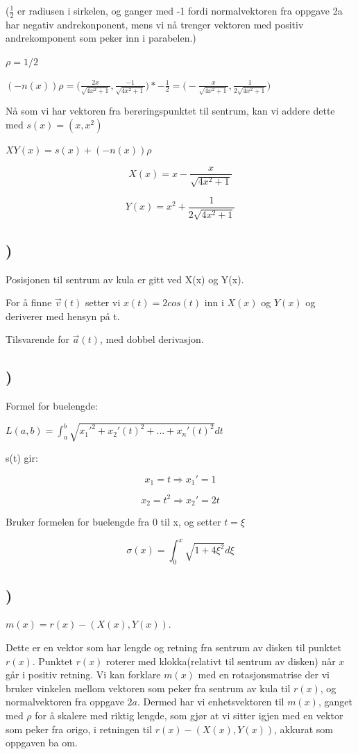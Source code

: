 \documentclass[a4paper,10pt,norsk]{article}
\begin{document}
($\frac{1}{2}$ er radiusen i sirkelen, og ganger med -1 fordi normalvektoren fra oppgave 2a har negativ andrekonponent, mens vi nå trenger vektoren med positiv andrekomponent som peker inn i parabelen.)

$\rho = 1/2$

$(-n(x))\rho= \Big( \frac{2x}{\sqrt{4x^{2} + 1}}, \frac{-1}{\sqrt{4x^{2} + 1}} \Big) * -\frac{1}{2} = \Big( -\frac{x}{\sqrt{4x^{2} + 1}}, \frac{1}{2\sqrt{4x^{2} + 1}} \Big)$

Nå som vi har vektoren fra berøringspunktet til sentrum, kan vi addere dette med $s(x) = (x, x^{2})$

$ XY(x) = s(x) + (-n(x))\rho$

\[X(x) = x - \frac{x}{\sqrt{4x^{2} + 1}}\]

\[Y(x) = x^{2} + \frac{1}{2\sqrt{4x^{2} + 1}}\]

\subsection{)}
Posisjonen til sentrum av kula er gitt ved X(x) og Y(x).

For å finne $\vec{v}(t)$ setter vi $x(t) = 2cos(t)$ inn i $X(x)$ og $Y(x)$ og deriverer med hensyn på t.

Tilsvarende for $\vec{a}(t)$, med dobbel derivasjon.

\subsection{)}

Formel for buelengde:

$L(a, b) = \int_{a}^{b} \sqrt{x_{1}'^{2} + x_{2}'(t)^{2} + ... + x_{n}'(t)^{2}} dt$

s(t) gir:

\[x_{1} = t \Rightarrow x_{1}' = 1\]

\[x_{2} = t^{2} \Rightarrow x_{2}' = 2t\]

Bruker formelen for buelengde fra 0 til x, og setter $ t = \xi$

\[\sigma(x) = \int_{0}^{x} \sqrt{1 + 4\xi^{2}} d\xi\]

\subsection{)}
$m(x) = r(x) - (X(x), Y(x))$. 

Dette er en vektor som har lengde og retning fra sentrum av disken til punktet $r(x)$. Punktet $r(x)$ roterer med klokka(relativt til sentrum av disken) når $x$ går i positiv retning. Vi kan forklare $m(x)$ med en rotasjonsmatrise der vi bruker vinkelen mellom vektoren som peker fra sentrum av kula til $r(x)$, og normalvektoren fra oppgave $2a$. Dermed har vi enhetsvektoren til $m(x)$, ganget med $\rho$ for å skalere med riktig lengde, som gjør at vi sitter igjen med en vektor som peker fra origo, i retningen til $r(x) - (X(x), Y(x))$, akkurat som oppgaven ba om.
\end{document}
